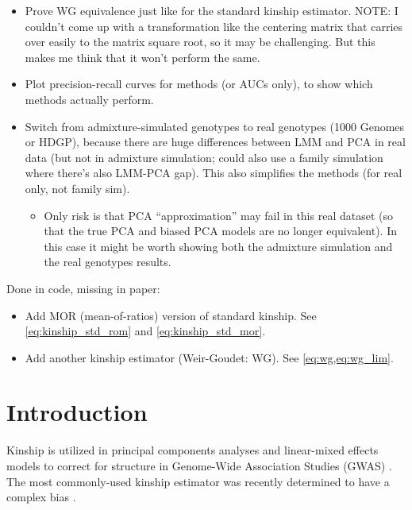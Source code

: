 \documentclass[11pt]{article}
\begin{document}
\begin{itemize}
\item Prove WG equivalence just like for the standard kinship estimator.
  NOTE: I couldn't come up with a transformation like the centering matrix that carries over easily to the matrix square root, so it may be challenging.
  But this makes me think that it won't perform the same.
\item Plot precision-recall curves for methods (or AUCs only), to show which methods actually perform.
\item Switch from admixture-simulated genotypes to real genotypes (1000 Genomes or HDGP), because there are huge differences between LMM and PCA in real data (but not in admixture simulation; could also use a family simulation where there's also LMM-PCA gap).
  This also simplifies the methods (for real only, not family sim).
  \begin{itemize}
  \item Only risk is that PCA ``approximation'' may fail in this real dataset (so that the true PCA and biased PCA models are no longer equivalent).
    In this case it might be worth showing both the admixture simulation and the real genotypes results.
  \end{itemize}
\end{itemize}

\noindent
Done in code, missing in paper:
\begin{itemize}
\item Add MOR (mean-of-ratios) version of standard kinship.
  See \cref{eq:kinship_std_rom} and \cref{eq:kinship_std_mor}.
\item Add another kinship estimator (Weir-Goudet: WG).
  See \cref{eq:wg,eq:wg_lim}.
\end{itemize}


\clearpage

\section{Introduction}

Kinship is utilized in principal components analyses and linear-mixed effects models to correct for structure in Genome-Wide Association Studies (GWAS) \citep{xie_combining_1998,yu_unified_2006, aulchenko_genomewide_2007, price_principal_2006, astle_population_2009,kang_efficient_2008, kang_variance_2010, yang_gcta:_2011, zhou_genome-wide_2012, loh_efficient_2015, sul_population_2018}.
The most commonly-used kinship estimator \citep{price_principal_2006, astle_population_2009, rakovski_kinship-based_2009, thornton_roadtrips:_2010, yang_common_2010, yang_gcta:_2011, zhou_genome-wide_2012, speed_improved_2012, speed_relatedness_2015, loh_efficient_2015, wang_efficient_2017, sul_population_2018} was recently determined to have a complex bias \citep{weir_unified_2017, ochoa_estimating_2021}.
\end{document}
